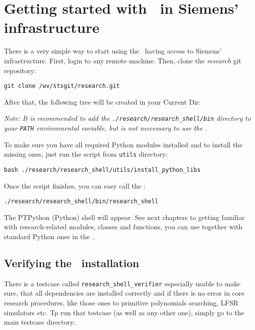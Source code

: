 \section{Getting started with \ShellName\ in Siemens' infrastructure}

There is a very simple way to start using the \ShellName\ having access to Siemens' infrastructure. First, login to any remote machine. Then, clone the \textit{research} git repository:

\texttt{git clone /wv/stsgit/research.git}

\noindent After that, the following tree will be created in your Current Dir:


\noindent \textit{Note: It is recommended to add the \texttt{./research/research\_shell/bin} directory to your \texttt{PATH} environmental variable, but is not neccessary to use the \ShellName.}

To make sure you have all required Python modules installed and to install the missing ones, just run the script from \texttt{utils} directory:

\texttt{bash ./research/research\_shell/utils/install\_python\_libs}

\noindent Once the script finishes, you can easy call the \ShellName:

\texttt{./research/research\_shell/bin/research\_shell}

\noindent The PTPython (Python) shell will appear. See next chapters to getting familiar with research-related modules, classes and functions, you can use together with standard Python ones in the \ShellName.

\subsection{Verifying the \ShellName\ installation}

There is a testcase called \texttt{research\_shell\_verifier} especially usable to make sure, that all dependencies are installed correctly and if there is no error in core research procedures, like those ones to primitive polynomials searching, LFSR simulators etc. Tp run that testcase (as well as any other one), simply go to the main testcase directory:

